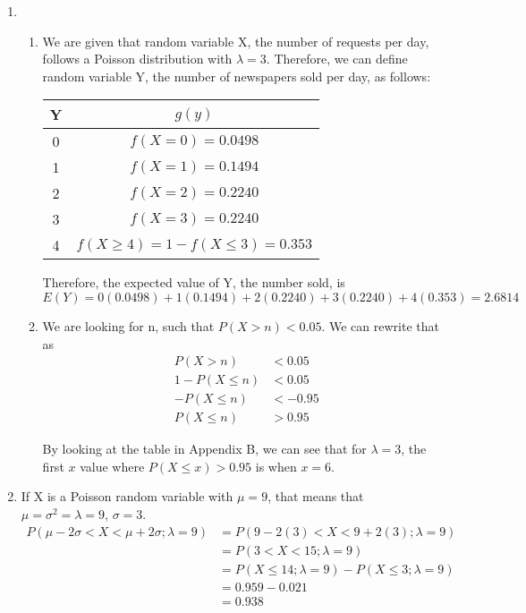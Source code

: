 \documentclass{article}
\begin{document}
\begin{enumerate}
     \item
      \begin{enumerate}
       \item
	We are given that random variable X, the number of requests per day, follows a Poisson distribution
	with $\lambda=3$. Therefore, we can define random variable Y, the number of newspapers sold per day,
	as follows:
	
	\begin{center}	 
	  \begin{tabular}{c | c}
		Y & $g(y)$ \\
		\hline
		0 & $f(X=0) = 0.0498$ \\
		1 & $f(X=1) = 0.1494$ \\
		2 & $f(X=2) = 0.2240$ \\
		3 & $f(X=3) = 0.2240$ \\
		4 & $f(X \ge 4) = 1 - f(X \le 3) = 0.353$
	  \end{tabular} 
	\end{center}
	
	Therefore, the expected value of Y, the number sold, is $$E(Y) = 0(0.0498) + 1(0.1494) + 2(0.2240) 
	 + 3(0.2240) + 4(0.353) = 2.6814$$
       
       \item
	We are looking for n, such that $P(X > n) < 0.05$. We can rewrite that as 
	\begin{align*}
	  P(X > n) &< 0.05 \\
	  1 - P(X \le n) &< 0.05 \\
	  -P(X \le n) &< -0.95 \\
	  P(X \le n) &> 0.95
	\end{align*}
	
	By looking at the table in Appendix B, we can see that for $\lambda=3$, the first $x$ value 
	where $P(X \le x) > 0.95$ is when $x=6$. 
      \end{enumerate}
     
     \item
      If X is a Poisson random variable with $\mu = 9$, that means that $\mu=\sigma^2=\lambda=9$, $\sigma=3$.
      \begin{align*}
       P(\mu - 2\sigma < X < \mu + 2\sigma; \lambda=9) &= P(9-2(3) < X < 9 + 2(3); \lambda=9)\\
	&= P(3 < X < 15; \lambda=9) \\
	&= P(X \le 14;\lambda=9) - P(X \le 3;\lambda=9) \\
	&= 0.959 - 0.021 \\
	&= 0.938
      \end{align*}

    \end{enumerate}
\end{document}
